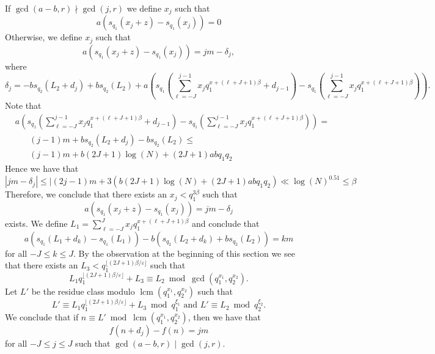\documentclass[12pt]{amsart}
\renewcommand{\leq}{\leqslant}
\DeclareMathOperator{\lcm}{lcm}
\theoremstyle{definition}
\numberwithin{equation}{section}
\numberwithin{equation}{section}
\begin{document}
If $\gcd(a-b,r)\nmid\gcd(j,r)$ we define $x_j$ such that
\[
	a(s_{q_1}(x_j+z)-s_{q_1}(x_j))=0
\]
Otherwise, we define $x_j$ such that
\begin{equation}\label{eq_def_x1}
	a(s_{q_1}(x_j+z)-s_{q_1}(x_j))=jm - \delta_j,
\end{equation}
where
\[
	\delta_j =  - bs_{q_2}(L_2+d_j)+bs_{q_2}(L_2) +a\left(s_{q_1}\left(\sum_{\ell = -J}^{j-1}x_{j}q_1^{x+(\ell+J+1)\beta}+d_{j-1}\right)-s_{q_1}\left(\sum_{\ell = -J}^{j-1}x_{j}q_1^{x+(\ell+J+1)\beta}\right)\right).
\]
Note that
\begin{align*}
	&a\left(s_{q_1}\left(\sum_{\ell = -J}^{j-1}x_{j}q_1^{x+(\ell+J+1)\beta}+d_{j-1}\right)-s_{q_1}\left(\sum_{\ell = -J}^{j-1}x_{j}q_1^{x+(\ell+J+1)\beta}\right)\right) = \\
	& \hspace{20pt} (j-1)m + bs_{q_2}(L_2+d_j)- bs_{q_2}(L_2) \leq \\
	& \hspace{20pt} (j-1)m + b(2J+1)\log(N) + (2J+1)abq_1q_2
\end{align*}
Hence we have that
\[
	|jm - \delta_j| \leq |(2j-1)m + 3(b(2J+1)\log(N) + (2J+1)abq_1q_2) \ll \log(N)^{0.51} \leq \beta
\]
Therefore, we conclude that there exists an $x_j<q_1^{3\beta}$ such that
\begin{equation}\label{eq_def_x}
	a(s_{q_1}(x_j+z)-s_{q_1}(x_j))=jm - \delta_j
\end{equation}
exists. We define $L_1=\sum_{\ell = -J}^{J}x_{j}q_1^{x+(\ell+J+1)\beta}$ and conclude that
\[
	a(s_{q_1}(L_1+d_{k})-s_{q_1}(L_1)) - b (s_{q_2}(L_2+d_k) + bs_{q_2}(L_2)) = km
\]
for all $-J\leq k\leq J$. By the observation at the beginning of this section we see that there exists an $L_3<q_1^{\lfloor(2J+1)\beta/\varepsilon\rfloor}$ such that
\[
	L_1q_1^{\lfloor(2J+1)\beta/\varepsilon\rfloor} + L_3 \equiv L_2 \bmod \gcd(q_1^{x_1},q_2^{x_2}).
\] 
Let $L'$ be the residue class modulo $\lcm (q_1^{x_1},q_2^{x_2})$ such that
\[
	L' \equiv L_1q_1^{\lfloor(2J+1)\beta/\varepsilon\rfloor} + L_3 \bmod q_1^{\xi_1} \text{ and } L' \equiv L_2 \bmod q_2^{\xi_2}.
\]
We conclude that if $n\equiv L' \bmod \lcm (q_1^{x_1},q_2^{x_2})$, then we have that
\[
	f(n+d_j)-f(n)=jm
\]
for all $-J\leq j\leq J$ such that $\gcd(a-b,r) \mid \gcd(j,r)$.
\end{document}
